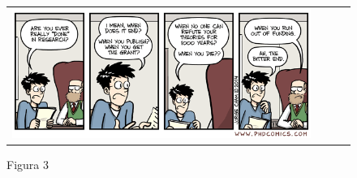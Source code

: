 \documentclass{article}
\begin{document}
\begin{figure}[htpb]
    \centering
    \begin{tabular}{cccc}
         \includegraphics[scale=0.7]{imagens/phdcomics.png} \\
    \end{tabular}
    \caption{Figura 3}
    \label{fig:my_label}
\end{figure}
\end{document}
